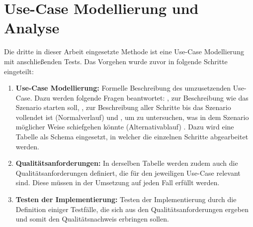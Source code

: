 \section{Use-Case Modellierung und Analyse}

Die dritte in dieser Arbeit eingesetzte Methode ist eine Use-Case Modellierung mit anschließenden Tests. Das Vorgehen wurde zuvor in folgende Schritte eingeteilt:
\begin{enumerate}
    \item \textbf{Use-Case Modellierung:} Formelle Beschreibung des umzusetzenden Use-Case. Dazu werden folgende Fragen beantwortet: \grqq{}, zur Beschreibung wie das Szenario starten soll, \grqq{}, zur Beschreibung aller Schritte bis das Szenario vollendet ist (Normalverlauf) und \grqq{}, um zu untersuchen, was in dem Szenario möglicher Weise schiefgehen könnte (Alternativablauf) \cite[Vgl.][S. 52]{Rosenberg2007}. Dazu wird eine Tabelle als Schema eingesetzt, in welcher die einzelnen Schritte abgearbeitet werden.
    \item \textbf{Qualitätsanforderungen:} In derselben Tabelle werden zudem auch die Qualitätsanforderungen definiert, die für den jeweiligen Use-Case relevant sind. Diese müssen in der Umsetzung auf jeden Fall erfüllt werden.
    \item \textbf{Testen der Implementierung:} Testen der Implementierung durch die Definition einiger Testfälle, die sich aus den Qualitätsanforderungen ergeben und somit den Qualitätsnachweis erbringen sollen.
\end{enumerate}

\pagebreak